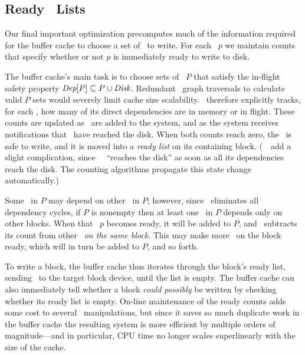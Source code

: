
\subsection{Ready \Patch\ Lists}
\label{sec:patch:readylist}

\newcommand{\PReady}[1]{\ensuremath{#1.\textit{ready}}}

Our final important optimization precomputes much of the information
required for the buffer cache to choose a set of \patches\ to write.
%
For each \patch\ $p$ we maintain counts that specify whether or not $p$ is
immediately ready to write to disk.


The buffer cache's main task is to choose sets of \patches\ $P$ that satisfy
the in-flight safety property $\PDepset{P} \subseteq P \cup \PDisk$.
%
Redundant \patch\ graph traversals to calculate valid $P$ sets would
severely limit cache size scalability.
%
\Kudos\ therefore explicitly tracks, for each \patch, how many of its
direct dependencies are in memory or in flight.
%
These counts are updated as \patches\ are added to the system, and as the
system receives notifications that \patches\ have reached the disk.
%
When both counts reach zero, the \patch\ is safe to write, and it is moved
into a \emph{ready list} on its containing block.
%
(\Noop\ \patches\ add a slight complication, since \anoop\ \patch\ ``reaches
the disk'' as soon as all its dependencies reach the disk.  The counting
algorithms propagate this state change automatically.)


Some \patches\ in $P$ may depend on other \patches\ in $P$; however, since
\Kudos\ eliminates all dependency cycles, if $P$ is nonempty then at least
one \patch\ in $P$ depends only on other blocks.
%
When that \patch\ $p$ becomes ready, it will be added to $P$, and \Kudos\
subtracts its count from other \patches\ \emph{on the same block}.
%
This may make more \patches\ on the block ready, which will in turn be added
to $P$, and so forth.


To write a block, the buffer cache thus iterates through the block's ready
list, sending \patches\ to the target block device, until the list is
empty. 
%
The buffer cache can also immediately tell whether a block \emph{could
possibly} be written by checking whether its ready list is empty.
%
On-line maintenance of the ready counts adds some cost to several \patch\
manipulations, but since it saves so much duplicate work in the buffer
cache the resulting system is more efficient by multiple orders of
magnitude---and in particular, CPU time no longer scales superlinearly with
the size of the cache.


